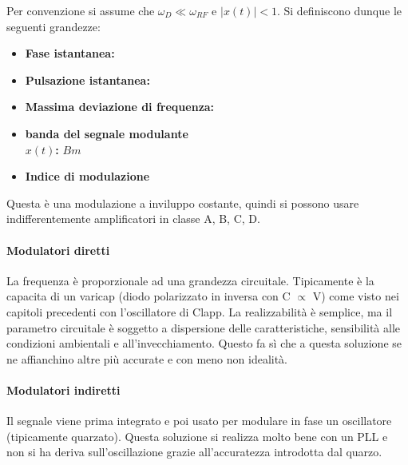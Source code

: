 Per convenzione si assume che $\omega_D \ll \omega_{RF}$ e $|x(t)|<1$. Si definiscono dunque le seguenti grandezze:
\begin{multicols}{2}
\begin{itemize}
	\item \textbf{Fase istantanea: }
	
	\item \textbf{Pulsazione istantanea: }
	\\
	
	\item \textbf{Massima deviazione di frequenza: }
	\columnbreak
	
	\item \textbf{banda del segnale modulante\\$x(t)$: }
	$B m$
	
	\item \textbf{Indice di modulazione}\\
	
\end{itemize}
\end{multicols}

Questa è una modulazione a inviluppo costante, quindi si possono usare indifferentemente amplificatori in classe A, B, C, D.

\paragraph{Modulatori diretti}
La frequenza è proporzionale ad una grandezza circuitale.
Tipicamente è la capacita di un varicap (diodo polarizzato in inversa con C $\propto$ V) come visto nei capitoli precedenti con l'oscillatore di Clapp.
La realizzabilità è semplice, ma il parametro circuitale è soggetto a dispersione delle caratteristiche, sensibilità alle condizioni ambientali e all'invecchiamento. Questo fa sì che a questa soluzione se ne affianchino altre più accurate e con meno non idealità.

\paragraph{Modulatori indiretti}
Il segnale viene prima integrato e poi usato per modulare in fase un oscillatore (tipicamente quarzato). Questa soluzione si realizza molto bene con un PLL e non si ha deriva sull'oscillazione grazie all'accuratezza introdotta dal quarzo.

